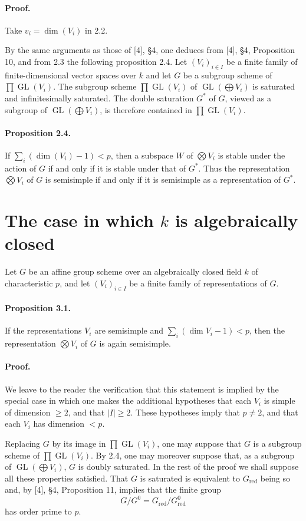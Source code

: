 \documentclass[11pt]{article}
\newcommand{\GL}{\operatorname{GL}}
\newcommand{\red}{\mathrm{red}}
\theoremstyle{plain}
\theoremstyle{definition}
\begin{document}
\paragraph{Proof.} Take $v_i=\dim(V_i)$ in 2.2.

By the same arguments as those of [4], \S4, one deduces from [4], \S4, Proposition 10, and from 2.3 the following proposition 2.4. Let $(V_i)_{i\in I}$ be a finite family of finite-dimensional vector spaces over $k$ and let $G$ be a subgroup scheme of $\prod\GL(V_i)$. The subgroup scheme $\prod\GL(V_i)$ of $\GL(\bigoplus V_i)$ is saturated and infinitesimally saturated. The double saturation $G^*$ of $G$, viewed as a subgroup of $\GL(\bigoplus V_i)$, is therefore contained in $\prod\GL(V_i)$.

\paragraph{Proposition 2.4.} If $\sum_i(\dim(V_i)-1)<p$, then a subspace $W$ of $\bigotimes V_i$ is stable under the action of $G$ if and only if it is stable under that of $G^*$. Thus the representation $\bigotimes V_i$ of $G$ is semisimple if and only if it is semisimple as a representation of $G^*$.

\section{The case in which $k$ is algebraically closed}
Let $G$ be an affine group scheme over an algebraically closed field $k$ of characteristic $p$, and let $(V_i)_{i\in I}$ be a finite family of representations of $G$.

\paragraph{Proposition 3.1.} If the representations $V_i$ are semisimple and $\sum_i(\dim V_i-1)<p$, then the representation $\bigotimes V_i$ of $G$ is again semisimple.

\paragraph{Proof.} We leave to the reader the verification that this statement is implied by the special case in which one makes the additional hypotheses that each $V_i$ is simple of dimension $\ge2$, and that $|I|\ge2$. These hypotheses imply that $p\ne2$, and that each $V_i$ has dimension $<p$.

Replacing $G$ by its image in $\prod\GL(V_i)$, one may suppose that $G$ is a subgroup scheme of $\prod\GL(V_i)$. By 2.4, one may moreover suppose that, as a subgroup of $\GL(\bigoplus V_i)$, $G$ is doubly saturated. In the rest of the proof we shall suppose all these properties satisfied. That $G$ is saturated is equivalent to $G_{\red}$ being so and, by [4], \S4, Proposition 11, implies that the finite group
\[
   G/G^0=G_{\red}/G^0_{\red}
\]
has order prime to $p$.
\end{document}
